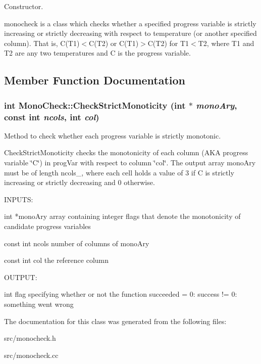 Constructor. 

monocheck is a class which checks whether a specified progress variable is strictly increasing or strictly decreasing with respect to temperature (or another specified column). That is, C(T1)$<$C(T2) or C(T1)$>$C(T2) for T1$<$T2, where T1 and T2 are any two temperatures and C is the progress variable. 

\subsection{Member Function Documentation}
\hypertarget{classMonoCheck_af34f3d72ec2d1575526d42bfe4cdfe7a}{
\subsubsection[{CheckStrictMonoticity}]{\setlength{\rightskip}{0pt plus 5cm}int MonoCheck::CheckStrictMonoticity (int $\ast$ {\em monoAry}, \/  const int {\em ncols}, \/  int {\em col})}}
\label{d8/ddf/classMonoCheck_af34f3d72ec2d1575526d42bfe4cdfe7a}


Method to check whether each progress variable is strictly monotonic. 

CheckStrictMonoticity checks the monotonicity of each column (AKA progress variable \char`\"{}C\char`\"{}) in progVar with respect to column \char`\"{}col\char`\"{}. The output array monoAry must be of length ncols\_\-, where each cell holds a value of 3 if C is strictly increasing or strictly decreasing and 0 otherwise.

\begin{DoxyVerb}
INPUTS:

int *monoAry        array containing integer flags that denote the monotonicity of candidate progress variables

const int ncols     number of columns of monoAry

const int col       the reference column


OUTPUT:

int                 flag specifying whether or not the function succeeded
                     = 0: success
		    != 0: something went wrong

\end{DoxyVerb}
 

The documentation for this class was generated from the following files:\begin{DoxyCompactItemize}
\item 
src/monocheck.h\item 
src/monocheck.cc\end{DoxyCompactItemize}
